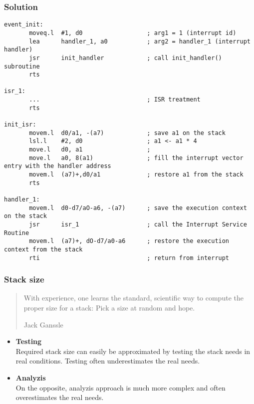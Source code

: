 \begin{frame}[containsverbatim]
  \frametitle{Solution}

  \begin{verbatim}
event_init:
       moveq.l  #1, d0                  ; arg1 = 1 (interrupt id)
       lea      handler_1, a0           ; arg2 = handler_1 (interrupt handler)
       jsr      init_handler            ; call init_handler() subroutine
       rts

isr_1:
       ...                              ; ISR treatment
       rts

init_isr:
       movem.l  d0/a1, -(a7)            ; save a1 on the stack
       lsl.l    #2, d0                  ; a1 <- a1 * 4
       move.l   d0, a1                  ; 
       move.l   a0, 8(a1)               ; fill the interrupt vector entry with the handler address
       movem.l  (a7)+,d0/a1             ; restore a1 from the stack
       rts

handler_1:
       movem.l  d0-d7/aO-a6, -(a7)      ; save the execution context on the stack
       jsr      isr_1                   ; call the Interrupt Service Routine
       movem.l  (a7)+, dO-d7/a0-a6      ; restore the execution context from the stack
       rti                              ; return from interrupt
  \end{verbatim}

\end{frame}

%
%
%

\begin{frame}
  \frametitle{Stack size}

  \begin{quote}
    With experience, one learns the standard, scientific way to compute the
    proper size for a stack: Pick a size at random and hope.

    \begin{flushright}
     Jack Ganssle
    \end{flushright}
  \end{quote}


  \-

  \begin{itemize}

    \item {\bf Testing}\\
      Required stack size can easily be approximated by testing the stack needs
      in real conditions. Testing often underestimates the real needs.

    \-

    \item {\bf Analyzis}\\
      On the opposite, analyzis approach is much more complex and often
      overestimates the real needs.
  \end{itemize}

\end{frame}

